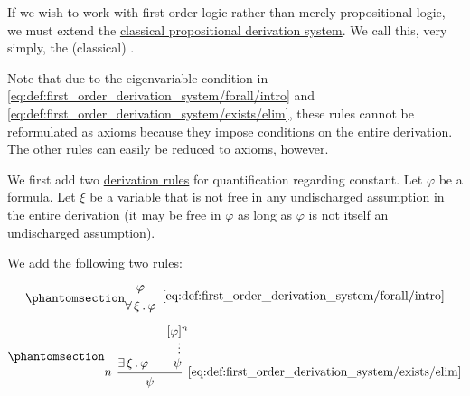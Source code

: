 \begin{definition}\label{def:first_order_derivation_system}
  If we wish to work with first-order logic rather than merely propositional logic, we must extend the \hyperref[def:propositional_derivation_system]{classical propositional derivation system}. We call this, very simply, the (classical) .

  Note that due to the eigenvariable condition in \eqref{eq:def:first_order_derivation_system/forall/intro} and \eqref{eq:def:first_order_derivation_system/exists/elim}, these rules cannot be reformulated as axioms because they impose conditions on the entire derivation. The other rules can easily be reduced to axioms, however.

  \begin{thmenum}
     We first add two \hyperref[def:proof_derivation_system/rules]{derivation rules} for quantification regarding constant. Let \( \varphi \) be a formula. Let \( \xi \) be a variable that is not free in any undischarged assumption in the entire derivation (it may be free in \( \varphi \) as long as \( \varphi \) is not itself an undischarged assumption).

    We add the following two rules:

    \begin{minipage}{0.45\textwidth}
      \begin{equation*}\taglabel[\textrm{R} \( \forall^+ \)]{eq:def:first_order_derivation_system/forall/intro}
        \begin{prooftree}
          \hypo{ \varphi }
          \infer1[\ref{eq:def:first_order_derivation_system/forall/intro}]{ \qforall \xi \varphi }
        \end{prooftree}
      \end{equation*}
    \end{minipage}
    \hfill
    \begin{minipage}{0.45\textwidth}
      \begin{equation*}\taglabel[\textrm{R} \( \exists^- \)]{eq:def:first_order_derivation_system/exists/elim}
        \begin{prooftree}
          \hypo{ \qexists \xi \varphi }
          \hypo{ [\varphi]^n }
          \ellipsis {} { \psi }
          \infer[left label=\( n \)]2[\ref{eq:def:first_order_derivation_system/exists/elim}]{ \psi }
        \end{prooftree}
      \end{equation*}
    \end{minipage}


\end{thmenum}
\end{definition}
